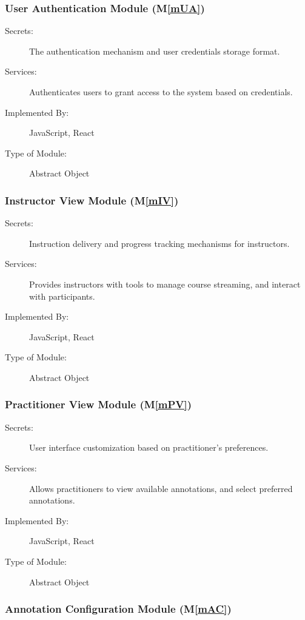 \documentclass[12pt, titlepage]{article}
\newcommand{\mref}[1]{M\ref{#1}}
\begin{document}
\subsubsection{User Authentication Module (\mref{mUA})}

\begin{description}
\item[Secrets:] The authentication mechanism and user credentials storage format.
\item[Services:] Authenticates users to grant access to the system based on credentials.
\item[Implemented By:] JavaScript, React
\item[Type of Module:] Abstract Object
\end{description}

\subsubsection{Instructor View Module (\mref{mIV})}

\begin{description}
\item[Secrets:] Instruction delivery and progress tracking mechanisms for instructors.
\item[Services:] Provides instructors with tools to manage course streaming, and interact with participants.
\item[Implemented By:] JavaScript, React
\item[Type of Module:] Abstract Object
\end{description}

\subsubsection{Practitioner View Module (\mref{mPV})}

\begin{description}
\item[Secrets:] User interface customization based on practitioner's preferences.
\item[Services:] Allows practitioners to view available annotations, and select preferred annotations.
\item[Implemented By:] JavaScript, React
\item[Type of Module:] Abstract Object
\end{description}

\subsubsection{Annotation Configuration Module (\mref{mAC})}
\end{document}
